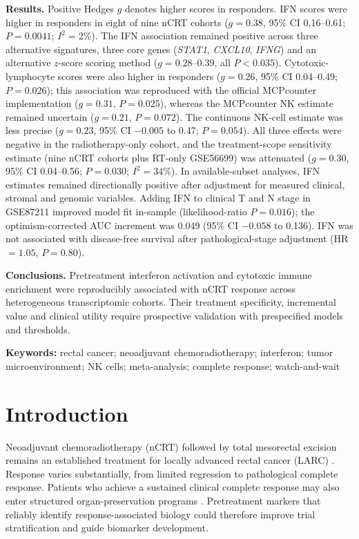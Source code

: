\documentclass[11pt,a4paper]{article}
\newcommand{\posg}{Positive Hedges $g$ denotes higher scores in responders.}
\begin{document}
\noindent\textbf{Results.} \posg{} IFN scores were higher in responders in eight of nine nCRT cohorts ($g=0.38$, 95\% CI 0.16--0.61; $P=0.0041$; $I^2=2\%$). The IFN association remained positive across three alternative signatures, three core genes (\textit{STAT1}, \textit{CXCL10}, \textit{IFNG}) and an alternative $z$-score scoring method ($g=0.28$--$0.39$, all $P<0.035$). Cytotoxic-lymphocyte scores were also higher in responders ($g=0.26$, 95\% CI 0.04--0.49; $P=0.026$); this association was reproduced with the official MCPcounter implementation ($g=0.31$, $P=0.025$), whereas the MCPcounter NK estimate remained uncertain ($g=0.21$, $P=0.072$). The continuous NK-cell estimate was less precise ($g=0.23$, 95\% CI $-0.005$ to 0.47; $P=0.054$). All three effects were negative in the radiotherapy-only cohort, and the treatment-scope sensitivity estimate (nine nCRT cohorts plus RT-only GSE56699) was attenuated ($g=0.30$, 95\% CI 0.04--0.56; $P=0.030$; $I^2=34\%$). In available-subset analyses, IFN estimates remained directionally positive after adjustment for measured clinical, stromal and genomic variables. Adding IFN to clinical T and N stage in GSE87211 improved model fit in-sample (likelihood-ratio $P=0.016$); the optimism-corrected AUC increment was 0.049 (95\% CI $-0.058$ to 0.136). IFN was not associated with disease-free survival after pathological-stage adjustment (HR$=1.05$, $P=0.80$).

\noindent\textbf{Conclusions.} Pretreatment interferon activation and cytotoxic immune enrichment were reproducibly associated with nCRT response across heterogeneous transcriptomic cohorts. Their treatment specificity, incremental value and clinical utility require prospective validation with prespecified models and thresholds.

\vspace{0.5em}
\noindent\textbf{Keywords:} rectal cancer; neoadjuvant chemoradiotherapy; interferon; tumor microenvironment; NK cells; meta-analysis; complete response; watch-and-wait

\linenumbers

\section{Introduction}

Neoadjuvant chemoradiotherapy (nCRT) followed by total mesorectal excision remains an established treatment for locally advanced rectal cancer (LARC) \cite{Sauer}. Response varies substantially, from limited regression to pathological complete response. Patients who achieve a sustained clinical complete response may also enter structured organ-preservation programs \cite{GarciaAguilar}. Pretreatment markers that reliably identify response-associated biology could therefore improve trial stratification and guide biomarker development.
\end{document}
